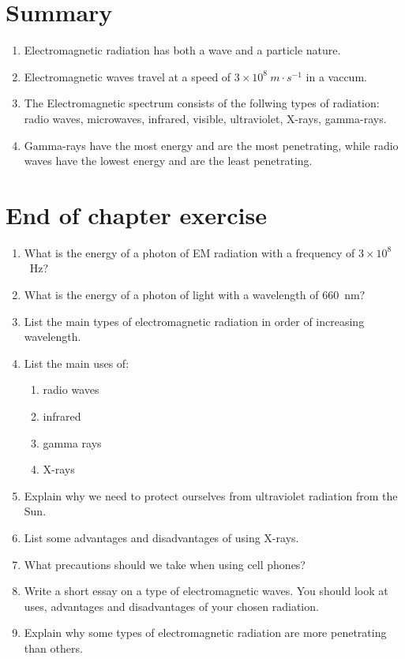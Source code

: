 \section {Summary}
\begin{enumerate}
\item Electromagnetic radiation has both a wave and a particle nature.
\item Electromagnetic waves travel at a speed of $3 \times 10^{8}~m \cdot s^{-1}$ in a vaccum.
\item The Electromagnetic spectrum consists of the follwing types of radiation: radio waves, microwaves, infrared, visible, ultraviolet, X-rays, gamma-rays.
\item Gamma-rays have the most energy and are the most penetrating, while radio waves have the lowest energy and are the least penetrating.

\end{enumerate}

\section{End of chapter exercise}
\begin{enumerate}

\item What is the energy of a photon of EM radiation with a frequency of $3 \times 10^{8}$~Hz? 

\item What is the energy of a photon of light with a wavelength of 660~nm?

\item List the main types of electromagnetic radiation in order of increasing wavelength.

\item List the main uses of:
\begin{enumerate}
\item radio waves
\item infrared
\item gamma rays
\item X-rays
\end{enumerate}

\item Explain why we need to protect ourselves from ultraviolet radiation from the Sun.

\item List some advantages and disadvantages of using X-rays.

\item What precautions should we take when using cell phones?

\item Write a short essay on a type of electromagnetic waves. You should look at uses, advantages and disadvantages of your chosen radiation.

\item Explain why some types of electromagnetic radiation are more penetrating than others.

\end{enumerate}


